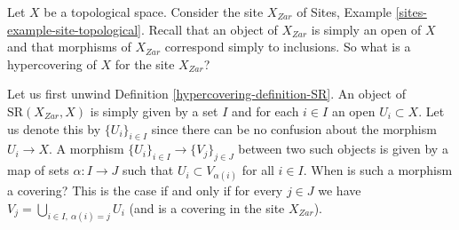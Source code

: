 \medskip\noindent
Let $X$ be a topological space. Consider the site $X_{Zar}$
of Sites, Example \ref{sites-example-site-topological}. Recall that
an object of $X_{Zar}$ is simply an open of $X$ and that morphisms
of $X_{Zar}$ correspond simply to inclusions. So what is a
hypercovering of $X$ for the site $X_{Zar}$?

\medskip\noindent
Let us first unwind Definition \ref{hypercovering-definition-SR}.
An object of $\text{SR}(X_{Zar}, X)$ is simply given by a set
$I$ and for each $i \in I$ an open $U_i \subset X$.
Let us denote this by $\{U_i\}_{i \in I}$ since there can be no
confusion about the morphism $U_i \to X$.
A morphism $\{U_i\}_{i \in I} \to \{V_j\}_{j \in J}$
between two such objects is given by a map of sets
$\alpha : I \to J$ such that $U_i \subset V_{\alpha(i)}$ for all
$i \in I$. When is such a morphism a covering? This is the case
if and only if for every $j \in J$ we have
$V_j = \bigcup_{i\in I, \ \alpha(i) = j} U_i$ (and is
a covering in the site $X_{Zar}$).

